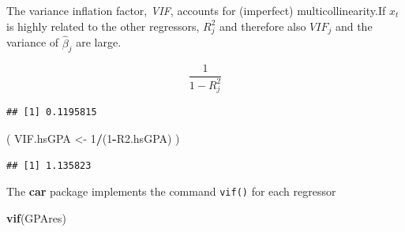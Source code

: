\documentclass[]{book}
\newenvironment{Shaded}{\begin{snugshade}}{\end{snugshade}}
\newcommand{\CommentTok}[1]{\textcolor[rgb]{0.56,0.35,0.01}{\textit{#1}}}
\newcommand{\DataTypeTok}[1]{\textcolor[rgb]{0.13,0.29,0.53}{#1}}
\newcommand{\DecValTok}[1]{\textcolor[rgb]{0.00,0.00,0.81}{#1}}
\newcommand{\KeywordTok}[1]{\textcolor[rgb]{0.13,0.29,0.53}{\textbf{#1}}}
\newcommand{\NormalTok}[1]{#1}
\newcommand{\OperatorTok}[1]{\textcolor[rgb]{0.81,0.36,0.00}{\textbf{#1}}}
\newcommand{\StringTok}[1]{\textcolor[rgb]{0.31,0.60,0.02}{#1}}
\begin{document}
The variance inflation factor, \emph{VIF}, accounts for (imperfect) multicollinearity.If \(x_t\) is highly related to the other regressors, \(R^2_j\) and therefore also \(VIF_j\) and the variance of \(\hat\beta_j\) are large.

\begin{equation}
\frac{1}{1-R^2_j}
\label{eq:VIF}
\end{equation}

\begin{Shaded}
\end{Shaded}

\begin{Shaded}
\end{Shaded}

\begin{verbatim}
## [1] 0.1195815
\end{verbatim}

\begin{Shaded}
\begin{Highlighting}[]
\NormalTok{( VIF.hsGPA <-}\StringTok{ }\DecValTok{1}\OperatorTok{/}\NormalTok{(}\DecValTok{1}\OperatorTok{-}\NormalTok{R2.hsGPA) )}
\end{Highlighting}
\end{Shaded}

\begin{verbatim}
## [1] 1.135823
\end{verbatim}

The \textbf{car} package implements the command \texttt{vif()} for each regressor

\begin{Shaded}
\begin{Highlighting}[]
\KeywordTok{vif}\NormalTok{(GPAres)}
\end{Highlighting}
\end{Shaded}
\end{document}
